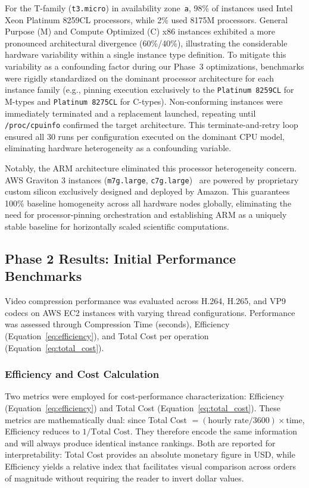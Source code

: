 \documentclass[conference]{IEEEtran}
\begin{document}
For the T-family (\texttt{t3.micro}) in availability zone~\texttt{a}, 98\% of
instances used Intel Xeon Platinum 8259CL processors, while 2\% used 8175M
processors. General Purpose (M) and Compute Optimized (C) x86 instances exhibited a more pronounced architectural
divergence (60\%/40\%), illustrating the considerable hardware variability within
a single instance type definition. To mitigate this variability as a
confounding factor during our Phase~3 optimizations, benchmarks were rigidly standardized on the dominant processor
architecture for each instance family (e.g., pinning execution exclusively to the \texttt{Platinum 8259CL} for M-types and \texttt{Platinum 8275CL} for C-types). Non-conforming instances were immediately terminated and a replacement
launched, repeating until \texttt{/proc/cpuinfo} confirmed the target
architecture. This terminate-and-retry loop ensured all 30 runs per
configuration executed on the dominant CPU model, eliminating hardware
heterogeneity as a confounding variable.

Notably, the ARM architecture eliminated this processor heterogeneity concern. AWS Graviton 3 instances (\texttt{m7g.large}, \texttt{c7g.large})~\cite{awsgrav3} are powered by proprietary custom silicon exclusively designed and deployed by Amazon. This guarantees 100\% baseline homogeneity across all hardware nodes globally, eliminating the need for processor-pinning orchestration and establishing ARM as a uniquely stable baseline for horizontally scaled scientific computations.

\subsection{Phase 2 Results: Initial Performance Benchmarks}

Video compression performance was evaluated across H.264, H.265, and VP9
codecs on AWS EC2 instances with varying thread configurations. Performance was
assessed through Compression Time (seconds), Efficiency
(Equation~\ref{eq:efficiency}), and Total Cost per operation
(Equation~\ref{eq:total_cost}).

\subsubsection{Efficiency and Cost Calculation}

Two metrics were employed for cost-performance characterization: Efficiency
(Equation~\ref{eq:efficiency}) and Total Cost (Equation~\ref{eq:total_cost}).
These metrics are mathematically dual: since Total Cost $= (\text{hourly rate}/3600) \times \text{time}$,
Efficiency reduces to $1/\text{Total Cost}$. They therefore encode the same
information and will always produce identical instance rankings. Both are
reported for interpretability: Total Cost provides an absolute monetary
figure in USD, while Efficiency yields a relative index that facilitates visual comparison across
orders of magnitude without requiring the reader to invert dollar values.
\end{document}
